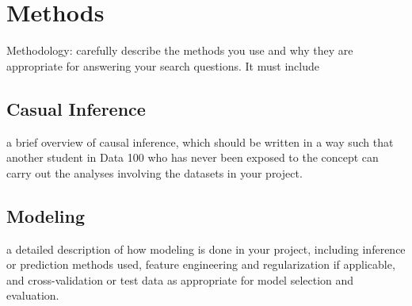 \section{Methods}
Methodology: carefully describe the methods you use and why they are appropriate for answering your search questions. It must include
\subsection{Casual Inference}
a brief overview of causal inference, which should be written in a way such that another student in Data 100 who has never been exposed to the concept can carry out the analyses involving the datasets in your project.
\subsection{Modeling}
a detailed description of how modeling is done in your project, including inference or prediction methods used, feature engineering and regularization if applicable, and cross-validation or test data as appropriate for model selection and evaluation.

